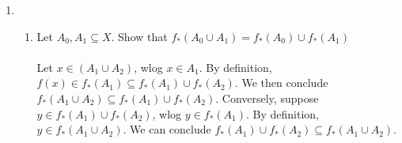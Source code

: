 \documentclass[11pt]{article}
\begin{document}
\begin{enumerate}
\begin{enumerate}

\end{enumerate} %
\newpage

\item %
\begin{enumerate}
\item Let $A_0 , A_1 \subseteq X$. Show that $f_*(A_0 \cup A_1 ) = f_*(A_0) \cup f_*(A_1)$
\\ \\
Let $x \in (A_1 \cup A_2)$, wlog $x \in A_1$.  By definition, $f(x) \in f_*(A_1) \subseteq f_*(A_1) \cup f_*(A_2).$  We then conclude $f_*(A_1 \cup A_2) \subseteq f_*(A_1) \cup f_*(A_2)$.  Conversely, suppose $y \in f_*(A_1) \cup f_*(A_2)$, wlog $y \in f_*(A_1)$.  By definition, $y \in f_*(A_1 \cup A_2)$.  We can conclude $f_*(A_1) \cup f_*(A_2) \subseteq f_*(A_1 \cup A_2)$.
\\


\end{enumerate}
\end{enumerate}
\end{document}
